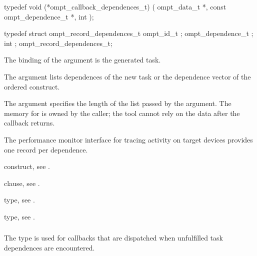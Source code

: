 \format
\begin{ccppspecific}
\begin{omptCallback}
typedef void (*ompt_callback_dependences_t) (
  ompt_data_t *,
  const ompt_dependence_t *,
  int 
);
\end{omptCallback}
\end{ccppspecific}

\record
\begin{ccppspecific}
\begin{omptRecord}
typedef struct ompt_record_dependences_t {
  ompt_id_t ;
  ompt_dependence_t ;
  int ;
} ompt_record_dependences_t;
\end{omptRecord}
\end{ccppspecific}

\argdesc
The binding of the  argument is the generated task.

The  argument lists dependences of the new task or the 
dependence vector of the ordered construct.

The  argument specifies the length of the list passed
by the  argument. The memory for  is owned by 
the caller; the tool cannot rely on the data after the callback returns.

The performance monitor interface for tracing activity on target devices 
provides one record per dependence.

\begin{crossrefs}
\item {} construct, see .

\item {} clause, see .

\item {} type, see
.

\item {} type, see
.
\end{crossrefs}



\subsubsection{}
\label{sec:ompt_callback_task_dependence_t}
\summary
The  type is used for callbacks that are 
dispatched when unfulfilled task dependences are encountered.

